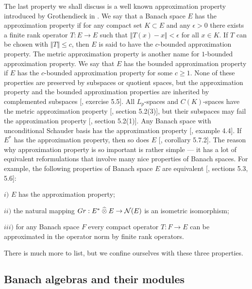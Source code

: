 The last property we shall discuss is a well known approximation property introduced by Grothendieck in \cite{GrothProdTenTopNucl}. We say that a Banach space $E$ has the approximation property if for any compact set $K\subset E$ and any $\epsilon>0$ there exists a finite rank operator $T:E\to E$ such that $\Vert T(x)-x\Vert<\epsilon$ for all $x\in K$. If $T$ can be chosen with $\Vert T\Vert\leq c$, then $E$ is said to have the $c$-bounded approximation property. The metric approximation property is another name for $1$-bounded approximation property. We say that $E$ has the bounded approximation property if $E$ has the $c$-bounded approximation property for some $c\geq 1$. None of these properties are preserved by subspaces or quotient spaces, but the approximation property and the bounded approximation properties are inherited by complemented subspaces [\cite{DefFloTensNorOpId}, exercise 5.5]. All $L_p$-spaces and $C(K)$-spaces have the metric approximation property [\cite{DefFloTensNorOpId}, section 5.2(3)], but their subspaces may fail the approximation property [\cite{DefFloTensNorOpId}, section 5.2(1)]. Any Banach space with unconditional Schauder basis has the approximation property [\cite{RyanIntroTensNormsBanSp}, example 4.4]. If $E^*$ has the approximation property, then so does $E$ [\cite{DefFloTensNorOpId}, corollary 5.7.2]. The reason why approximation property is so important is rather simple --- it has a lot of equivalent reformulations that involve many nice properties of Banach spaces. For example, the following properties of Banach space $E$ are equivalent [\cite{DefFloTensNorOpId}, sections 5.3, 5.6]:

$i)$ $E$ has the approximation property;

$ii)$ the natural mapping $Gr:E^*\mathbin{\widehat{\otimes}} E\to\mathcal{N}(E)$ is an isometric isomorphism;

$iii)$ for any Banach space $F$ every compact operator $T:F\to E$ can be approximated in the operator norm by finite rank operators.

There is much more to list, but we confine ourselves with these three properties.


\subsection{Banach algebras and their modules}
\label{SubSectionBanachAlgebrasAndTheirModules}

